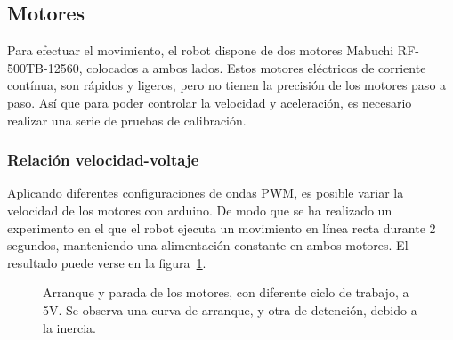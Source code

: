 \documentclass[10pt,a4paper,hidelinks,twocolumn,nobalancelastpage]{article}
\begin{document}
\subsection{Motores}
Para efectuar el movimiento, el robot dispone de dos motores Mabuchi 
RF-500TB-12560, colocados a ambos lados. Estos motores eléctricos de corriente 
contínua, son rápidos y ligeros, pero no tienen la precisión de los motores paso 
a paso. Así que para poder controlar la velocidad y aceleración, es necesario 
realizar una serie de pruebas de calibración.

\subsubsection{Relación velocidad-voltaje}
Aplicando diferentes configuraciones de ondas PWM, es posible variar la 
velocidad de los motores con arduino. De modo que se ha realizado un experimento 
en el que el robot ejecuta un movimiento en línea recta durante 2 segundos, 
manteniendo una alimentación constante en ambos motores. El resultado puede 
verse en la figura~\ref{fig:velocidad-voltaje}.

\begin{figure}[h]
\centering
{}
\caption{Arranque y parada de los motores, con diferente ciclo de trabajo, a 5V.  
Se observa una curva de arranque, y otra de detención, debido a la inercia.
\label{fig:velocidad-voltaje}}
\end{figure}
\end{document}
